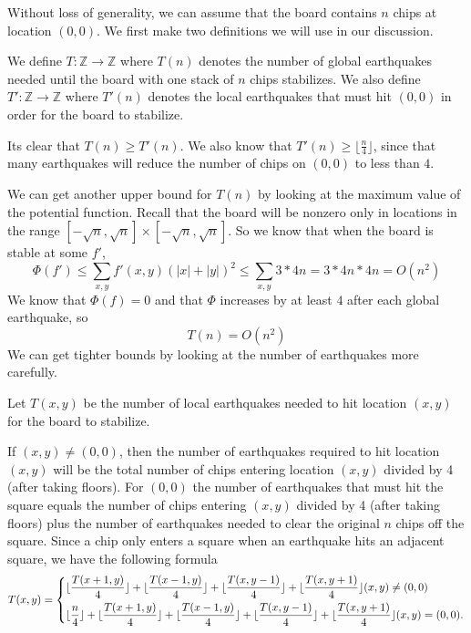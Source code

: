 \documentclass[runningheads,a4paper]{llncs}
\begin{document}
Without loss of generality, we can assume that the board contains $n$ chips at location $(0,0)$. We first make two definitions we will use in our discussion.
\begin{definition}
We define $T: \mathbb{Z} \rightarrow \mathbb{Z}$ where $T(n)$ denotes the number of global earthquakes needed until the board with one stack of $n$ chips stabilizes. We also define $T':\mathbb{Z} \rightarrow \mathbb{Z}$ where $T'(n)$ denotes the local earthquakes that must hit $(0,0)$ in order for the board to stabilize. 
\end{definition}
Its clear that $T(n) \geq T'(n)$. We also know that $T'(n) \geq \lfloor \frac{n}{4}\rfloor$, since that many earthquakes will reduce the number of chips on $(0,0)$ to less than $4$.

We can get another upper bound for $T(n)$ by looking at the maximum value of the potential function. Recall that the board will be nonzero only in locations in the range $[-\sqrt{n}, \sqrt{n}] \times [-\sqrt{n}, \sqrt{n}]$. 
So we know that when the board is stable at some $f'$, 
\begin{equation*}
\Phi(f') \leq \sum_{x,y} f'(x,y)(|x| + |y|)^2 \leq \sum_{x,y} 3*4n = 3*4n*4n= O(n^2)
\end{equation*}
We know that $\Phi(f) = 0$ and that $\Phi$ increases by at least $4$ after each global earthquake, so
\[ T(n) = O(n^2) \]
We can get tighter bounds by looking at the number of earthquakes more carefully.
\begin{definition}
 Let $T(x,y)$ be the number of local earthquakes needed to hit location $(x,y)$ for the board to stabilize. 
 \end{definition}
 If $(x,y) \neq (0,0)$, then the number of earthquakes required to hit location $(x,y)$ will be the total number of chips entering location $(x,y)$ divided by 4 (after taking floors). For $(0,0)$ the number of earthquakes that must hit the square equals the number of chips entering $(x,y)$ divided by 4 (after taking floors) plus the number of earthquakes needed to clear the original $n$ chips off the square.
 Since a chip only enters a square when an earthquake hits an adjacent square, we have the following formula
\begin{equation*}
T(x,y) = \begin{dcases} \lfloor\frac{T(x+1, y)}{4} \rfloor + \lfloor \frac{T(x-1, y)}{4} \rfloor + \lfloor \frac{T(x, y-1)}{4} \rfloor + \lfloor \frac{T(x, y+1)}{4} \rfloor  (x,y) \neq (0,0) \\
 \lfloor \frac{n}{4} \rfloor  + \lfloor\frac{T(x+1, y)}{4} \rfloor + \lfloor \frac{T(x-1, y)}{4} \rfloor + \lfloor \frac{T(x, y-1)}{4} \rfloor + \lfloor \frac{T(x, y+1)}{4} \rfloor  (x,y) = (0,0) .
 \end{dcases}
 \end{equation*}
\end{document}
